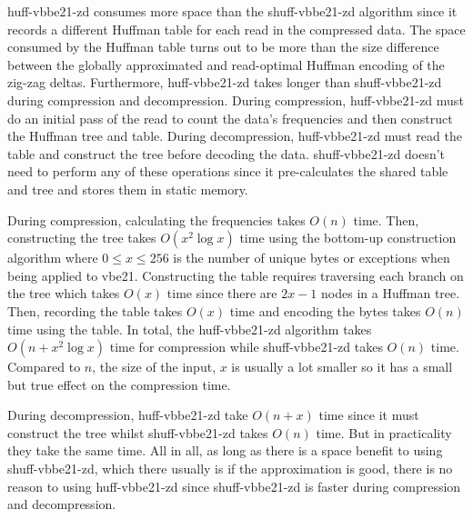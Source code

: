 huff-vbbe21-zd consumes more space than the shuff-vbbe21-zd algorithm since it
records a different Huffman table for each read in the compressed data. The
space consumed by the Huffman table turns out to be more than the size difference
between the globally approximated and read-optimal Huffman encoding of the
zig-zag deltas.
Furthermore, huff-vbbe21-zd takes longer than shuff-vbbe21-zd during compression and decompression.
During compression, huff-vbbe21-zd must do an initial pass of the read to count the data's
frequencies and then construct the Huffman tree and table. During
decompression, huff-vbbe21-zd must read the table and construct the tree before decoding
the data. shuff-vbbe21-zd doesn't need to perform any of these operations since it
pre-calculates the shared table and tree and stores them in static memory.

During compression, calculating the frequencies takes $O(n)$ time. Then,
constructing the tree takes $O(x^2\log x)$ time using the bottom-up construction
algorithm where $0\le x \le 256$ is the number of unique bytes or exceptions
when being applied to vbe21. Constructing the table requires traversing each
branch on the tree which takes $O(x)$ time since there are $2x-1$ nodes in a
Huffman tree. Then, recording the table takes $O(x)$ time and encoding the bytes
takes $O(n)$ time using the table. In total, the huff-vbbe21-zd algorithm takes
$O(n + x^2\log x)$ time for compression while shuff-vbbe21-zd takes $O(n)$ time. Compared
to $n$, the size of the input, $x$ is usually a lot smaller so it has a small
but true effect on the compression time.

During decompression, huff-vbbe21-zd take $O(n + x)$ time since it must construct the tree
whilst shuff-vbbe21-zd takes $O(n)$ time. But in practicality they take the same time. All
in all, as long as there is a space benefit to using shuff-vbbe21-zd, which there usually
is if the approximation is good, there is no reason to using huff-vbbe21-zd since shuff-vbbe21-zd is
faster during compression and decompression.



